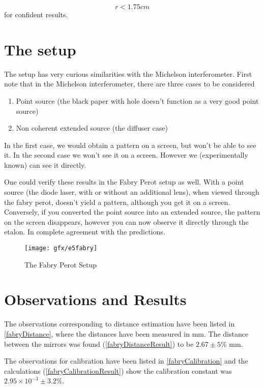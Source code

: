 \[
r<1.75cm
\]
for confident results.


\section{The setup}

The setup has very curious similarities with the Michelson interferometer.
First note that in the Michelson interferometer, there are three cases
to be considered
\begin{enumerate}
\item Point source (the black paper with hole doesn't function as a very
good point source)
\item Non coherent extended source (the diffuser case)
\end{enumerate}
In the first case, we would obtain a pattern on a screen, but won't
be able to see it. In the second case we won't see it on a screen.
However we (experimentally known) can see it directly.

One could verify these results in the Fabry Perot setup as well. With
a point source (the diode laser, with or without an additional lens),
when viewed through the fabry perot, doesn't yield a pattern, although
you get it on a screen. Conversely, if you converted the point source
into an extended source, the pattern on the screen disappears, however
you can now observe it directly through the etalon. In complete agreement
with the predictions.

\begin{figure}[bth]
	\begin{center}
		\texttt{[image: gfx/e5fabry]}
	\end{center}
\caption[The Fabry Perot Setup]{The Fabry Perot Setup}
\label{e4tv}
\end{figure}

\section{Observations and Results}
The observations corresponding to distance estimation have been listed in \autoref{fabryDistance}, where the distances have been measured in mm. The distance between the mirrors was found (\autoref{fabryDistanceResult}) to be $2.67 \pm 5\%$ mm.

The observations for calibration have been listed in \autoref{fabryCalibration} and the calculations (\autoref{fabryCalibrationResult}) show the calibration constant was $2.95\times10^{-3} \pm 3.2\%$.

\label{fabryDistance}
\label{fabryDistanceResult}
\label{fabryCalibration}
\label{fabryCalibrationResult}